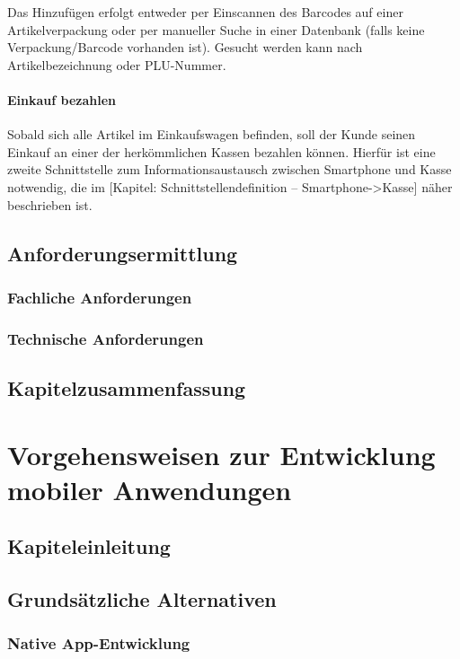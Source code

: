 Das Hinzufügen erfolgt entweder per Einscannen des Barcodes auf einer Artikelverpackung oder per manueller Suche in einer Datenbank (falls keine Verpackung/Barcode vorhanden ist). Gesucht werden kann nach Artikelbezeichnung oder PLU-Nummer.

\subsubsection*{Einkauf bezahlen}
Sobald sich alle Artikel im Einkaufswagen befinden, soll der Kunde seinen Einkauf an einer der herkömmlichen Kassen bezahlen können. Hierfür ist eine zweite Schnittstelle zum Informationsaustausch zwischen Smartphone und Kasse notwendig, die im [Kapitel: Schnittstellendefinition – Smartphone->Kasse] näher beschrieben ist.

\section{Anforderungsermittlung}

\subsection{Fachliche Anforderungen}

\subsection{Technische Anforderungen}

\section{Kapitelzusammenfassung}

\chapter{Vorgehensweisen zur Entwicklung mobiler Anwendungen}

\section{Kapiteleinleitung}

\section{Grundsätzliche Alternativen}
\subsection{Native App-Entwicklung}
